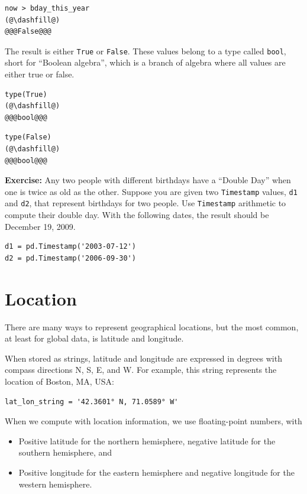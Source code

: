 \begin{lstlisting}[]
now > bday_this_year
(@\dashfill@)
@@@False@@@
\end{lstlisting}

The result is either \passthrough{\lstinline!True!} or
\passthrough{\lstinline!False!}. These values belong to a type called
\passthrough{\lstinline!bool!}, short for ``Boolean algebra'', which is
a branch of algebra where all values are either true or false.

\begin{lstlisting}[]
type(True)
(@\dashfill@)
@@@bool@@@
\end{lstlisting}

\begin{lstlisting}[]
type(False)
(@\dashfill@)
@@@bool@@@
\end{lstlisting}

\textbf{Exercise:} Any two people with different birthdays have a
``Double Day'' when one is twice as old as the other. Suppose you are
given two \passthrough{\lstinline!Timestamp!} values,
\passthrough{\lstinline!d1!} and \passthrough{\lstinline!d2!}, that
represent birthdays for two people. Use
\passthrough{\lstinline!Timestamp!} arithmetic to compute their double
day. With the following dates, the result should be December 19, 2009.

\begin{lstlisting}[]
d1 = pd.Timestamp('2003-07-12')
d2 = pd.Timestamp('2006-09-30')
\end{lstlisting}

\hypertarget{location}{%
\section{Location}\label{location}}

There are many ways to represent geographical locations, but the most
common, at least for global data, is latitude and longitude.

When stored as strings, latitude and longitude are expressed in degrees
with compass directions N, S, E, and W. For example, this string
represents the location of Boston, MA, USA:

\begin{lstlisting}[]
lat_lon_string = '42.3601° N, 71.0589° W'
\end{lstlisting}

When we compute with location information, we use floating-point
numbers, with

\begin{itemize}
\item
  Positive latitude for the northern hemisphere, negative latitude for
  the southern hemisphere, and
\item
  Positive longitude for the eastern hemisphere and negative longitude
  for the western hemisphere.
\end{itemize}

